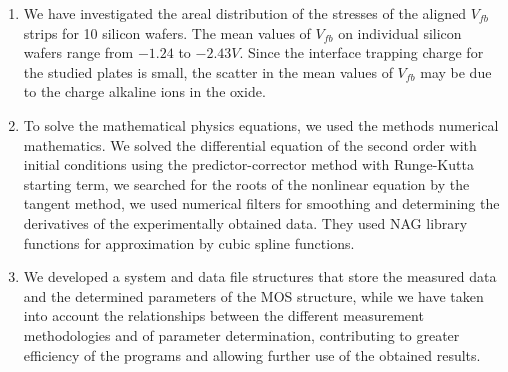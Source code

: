 \begin{enumerate}
\item We have investigated the areal distribution of the stresses of
  the aligned $V_{fb}$ strips for 10 silicon wafers. The mean values
  of $V_{fb}$ on individual silicon wafers range from $-1.24$ to
  $-2.43 V$. Since the interface trapping charge for the studied
  plates is small, the scatter in the mean values of $V_{fb}$ may be
  due to the charge alkaline ions in the oxide.

\item To solve the mathematical physics equations, we used the methods
numerical mathematics. We solved the differential equation of the
second order with initial conditions using the predictor-corrector
method with Runge-Kutta starting term, we searched for the roots of
the nonlinear equation by the tangent method, we used numerical
filters for smoothing and determining the derivatives of the
experimentally obtained data. They used NAG library functions for
approximation by cubic spline functions.

\item We developed a system and data file structures that store the
  measured data and the determined parameters of the MOS structure,
  while we have taken into account the relationships between the
  different measurement methodologies and of parameter determination,
  contributing to greater efficiency of the programs and allowing
  further use of the obtained results.

\end{enumerate}
